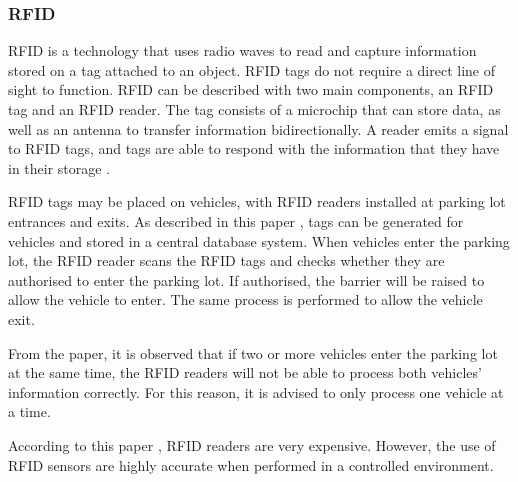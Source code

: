 \subsubsection*{\ac{RFID}}
\ac{RFID} is a technology that uses radio waves to read and capture information stored on a tag attached to an object. \ac{RFID} tags do not require a direct line of sight to function. \ac{RFID} can be described with two main components, an \ac{RFID} tag and an \ac{RFID} reader. The tag consists of a microchip that can store data, as well as an antenna to transfer information bidirectionally. A reader emits a signal to \ac{RFID} tags, and tags are able to respond with the information that they have in their storage \citep{Want2006AnRFID}.

\ac{RFID} tags may be placed on vehicles, with \ac{RFID} readers installed at parking lot entrances and exits. As described in this paper \citep{pala_smart_2007}, tags can be generated for vehicles and stored in a central database system. When vehicles enter the parking lot, the \ac{RFID} reader scans the \ac{RFID} tags and checks whether they are authorised to enter the parking lot. If authorised, the barrier will be raised to allow the vehicle to enter. The same process is performed to allow the vehicle exit.

From the paper, it is observed that if two or more vehicles enter the parking lot at the same time, the \ac{RFID} readers will not be able to process both vehicles' information correctly. For this reason, it is advised to only process one vehicle at a time.

According to this paper \citep{dokur_embedded_2016}, \ac{RFID} readers are very expensive. However, the use of \ac{RFID} sensors are highly accurate when performed in a controlled environment.